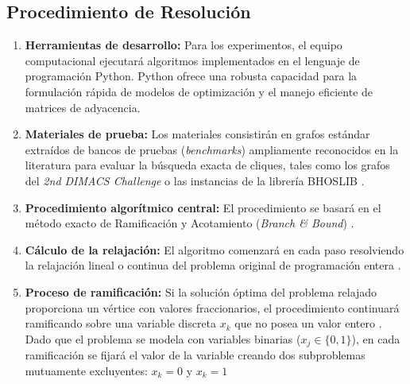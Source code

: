 \subsection{Procedimiento de Resolución}

\begin{enumerate}
    \item \textbf{Herramientas de desarrollo:} Para los experimentos, el equipo computacional ejecutará algoritmos implementados en el lenguaje de programación Python. Python ofrece una robusta capacidad para la formulación rápida de modelos de optimización y el manejo eficiente de matrices de adyacencia. 
    
    \item \textbf{Materiales de prueba:} Los materiales consistirán en grafos estándar extraídos de bancos de pruebas (\textit{benchmarks}) ampliamente reconocidos en la literatura para evaluar la búsqueda exacta de cliques, tales como los grafos del \textit{2nd DIMACS Challenge} o las instancias de la librería BHOSLIB \cite{dimacs1993, bhoslib, pardalos1992}.
    
    \item \textbf{Procedimiento algorítmico central:} El procedimiento se basará en el método exacto de Ramificación y Acotamiento (\textit{Branch \& Bound}) \cite{carraghan1990, pardalos1992}. 
    
    \item \textbf{Cálculo de la relajación:} El algoritmo comenzará en cada paso resolviendo la relajación lineal o continua del problema original de programación entera \cite{nemhauser1988}. 
    
    \item \textbf{Proceso de ramificación:} Si la solución óptima del problema relajado proporciona un vértice con valores fraccionarios, el procedimiento continuará ramificando sobre una variable discreta $x_k$ que no posea un valor entero \cite{carraghan1990, nemhauser1988}. Dado que el problema se modela con variables binarias ($x_j \in \{0,1\}$), en cada ramificación se fijará el valor de la variable creando dos subproblemas mutuamente excluyentes: $x_k = 0$ y $x_k = 1$
\end{enumerate}

